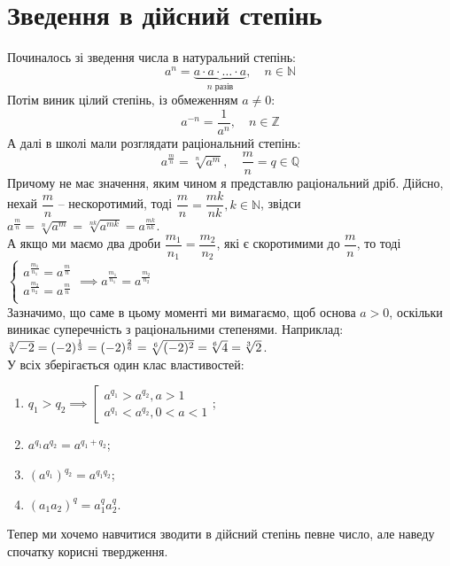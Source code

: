 \documentclass[a4paper, 14pt]{article}
\theoremstyle{theoremdd}
\theoremstyle{theoremdd}
\theoremstyle{theoremdd}
\theoremstyle{theoremdd}
\theoremstyle{theoremdd}
\theoremstyle{theoremdd}
\theoremstyle{theoremdd}
\theoremstyle{theoremdd}
\begin{document}
\section*{Зведення в дійсний степінь}
Починалось зі зведення числа в натуральний степінь:
$$a^n = \underbrace{a \cdot a \cdot \dots \cdot a}_{n\text{ разів}}, \quad n \in \mathbb{N}$$
Потім виник цілий степінь, із обмеженням $a \neq 0$:
$$a^{-n} = \dfrac{1}{a^n}, \quad n \in \mathbb{Z}$$
А далі в школі мали розглядати раціональний степінь:
$$a^{\frac{m}{n}} = \sqrt[n]{a^m}, \quad \dfrac{m}{n} = q \in \mathbb{Q}$$
Причому не має значення, яким чином я представлю раціональний дріб. Дійсно, нехай $\dfrac{m}{n}$ -- нескоротимий, тоді $\dfrac{m}{n} = \dfrac{mk}{nk}, k \in \mathbb{N}$, звідси\\
$a^{\frac{m}{n}} = \sqrt[n]{a^m} = \sqrt[nk]{a^{mk}} = a^{\frac{mk}{nk}}$.\\
А якщо ми маємо два дроби $\dfrac{m_1}{n_1} = \dfrac{m_2}{n_2}$, які є скоротимими до $\dfrac{m}{n}$, то тоді\\
$\begin{cases}
a^{\textstyle \frac{m_1}{n_1}} = a^{\textstyle \frac{m}{n}} \\
a^{\textstyle \frac{m_2}{n_2}} = a^{\textstyle \frac{m}{n}} \\
\end{cases} \implies a^{\textstyle \frac{m_1}{n_1}} = a^{\textstyle \frac{m_2}{n_2}}$
\bigskip \\
Зазначимо, що саме в цьому моменті ми вимагаємо, щоб основа $a > 0$, оскільки виникає суперечність з раціональними степенями. Наприклад:\\
$\sqrt[\leftroot{2} 3]{-2} = (-2)^{\frac{1}{3}} = (-2)^{\frac{2}{6}} = \sqrt[6]{(-2)^2} = \sqrt[\leftroot{2} 6]{4} = \sqrt[\leftroot{2} 3]{2}$.
\bigskip \\
У всіх зберігається один клас властивостей:
\begin{enumerate}[nosep,wide=0pt,label={\arabic*)}]
\item $q_1 > q_2 \implies \left[ \begin{gathered} a^{q_1} > a^{q_2}, a>1 \\ a^{q_1} < a^{q_2}, 0<a<1 \end{gathered} \right.$;
\item $a^{q_1} a^{q_2} = a^{q_1+q_2}$;
\item $(a^{q_1})^{q_2} = a^{q_1q_2}$;
\item $(a_1 a_2)^{q} = a_1^q a_2^q$.
\end{enumerate}
Тепер ми хочемо навчитися зводити в дійсний степінь певне число, але наведу спочатку корисні твердження.
\end{document}
